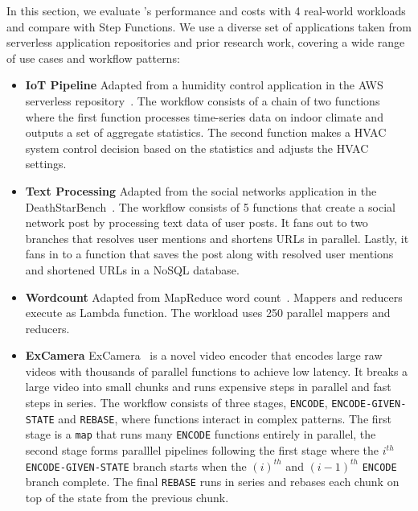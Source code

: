 In this section, we evaluate \name{}'s performance and costs with 4 real-world
workloads and compare with Step Functions. We use a diverse set of
applications taken from serverless application repositories and prior research
work, covering a wide range of use cases and workflow patterns:

\begin{itemize}

	\item \textbf{IoT Pipeline} Adapted from a humidity control application in the
    AWS serverless repository~\cite{iot-pipeline}. The workflow consists of a
    chain of two functions where the first function processes time-series data
    on indoor climate and outputs a set of aggregate statistics. The second
    function makes a HVAC system control decision based on the statistics and
    adjusts the HVAC settings.
	
	\item \textbf{Text Processing} Adapted from the social networks application in
    the DeathStarBench~\cite{deathstar}. The workflow consists of 5 functions
    that create a social network post by processing text data of user posts.
    It fans out to two branches that resolves user mentions and shortens URLs
    in parallel. Lastly, it fans in to a function that saves the post along
    with resolved user mentions and shortened URLs in a NoSQL database.
	
    \item \textbf{Wordcount} Adapted from MapReduce word
    count~\cite{mapreduce}. Mappers and reducers execute as Lambda function.
    The workload uses 250 parallel mappers and reducers.
	
	\item \textbf{ExCamera} ExCamera~\cite{excamera} is a novel video encoder that
    encodes large raw videos with thousands of parallel functions to achieve
    low latency. It breaks a large video into small chunks and runs expensive
    steps in parallel and fast steps in series. The workflow consists of three
    stages, \texttt{ENCODE}, \texttt{ENCODE-GIVEN-STATE} and \texttt{REBASE},
    where functions interact in complex patterns. The first stage is a
    \texttt{map} that runs many \texttt{ENCODE} functions entirely in
    parallel, the second stage forms paralllel pipelines following the first
    stage where the $i^{th}$ \texttt{ENCODE-GIVEN-STATE} branch starts when
    the $(i)^{th}$ and $(i-1)^{th}$ \texttt{ENCODE} branch complete. The final
    \texttt{REBASE} runs in series and rebases each chunk on top of the state
    from the previous chunk.
	

\end{itemize}
